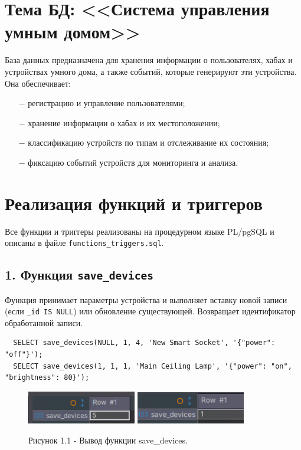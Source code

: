 \documentclass[oneside,a4paper,14pt]{extarticle}
\begin{document}
\clearpage
\section*{Тема БД: <<Система управления умным домом>>}
База данных предназначена для хранения информации о пользователях, хабах и устройствах умного дома, а также событий, которые генерируют эти устройства. Она обеспечивает:
\begin{itemize}
  \item[$-$] регистрацию и управление пользователями;
  \item[$-$] хранение информации о хабах и их местоположении;
  \item[$-$] классификацию устройств по типам и отслеживание их состояния;
  \item[$-$] фиксацию событий устройств для мониторинга и анализа.
\end{itemize}

\section*{Реализация функций и триггеров}

Все функции и триггеры реализованы на процедурном языке PL/pgSQL и описаны в файле \texttt{functions\_triggers.sql}.

\subsection*{1. Функция \texttt{save\_devices}}

Функция принимает параметры устройства и выполняет вставку новой записи (если \texttt{\_id IS NULL}) или обновление существующей. Возвращает идентификатор обработанной записи.

\begin{verbatim}
  SELECT save_devices(NULL, 1, 4, 'New Smart Socket', '{"power": "off"}');
  SELECT save_devices(1, 1, 1, 'Main Ceiling Lamp', '{"power": "on", "brightness": 80}');
\end{verbatim}

\begin{figure}[H]
  \centering
  \includegraphics[width=0.425\textwidth]{pics/save_devices_1.png}
  \includegraphics[width=0.425\textwidth]{pics/save_devices_2.png}
  \caption*{Рисунок 1.1 - Вывод функции save\_devices.}
\end{figure}
\end{document}

